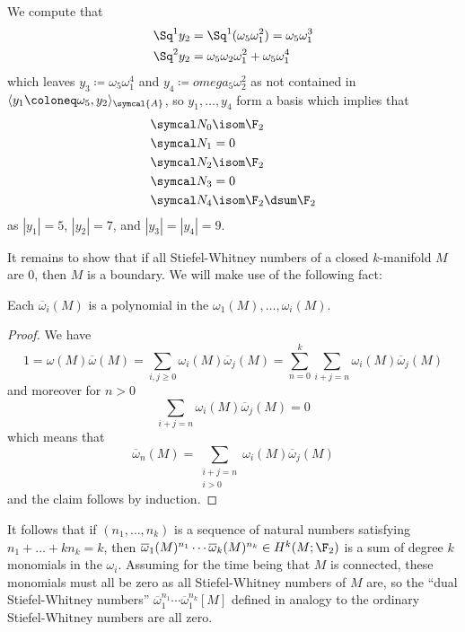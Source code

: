 \begin{example}
	We compute that
	\begin{align*}
		\Sq^1 y_2 &= \Sq^1 (\omega_5 \omega_1^2) = \omega_5 \omega_1^3 \\
		\Sq^2 y_2 &= \omega_5 \omega_2 \omega_1^2 + \omega_5 \omega_1^4
	\end{align*}
	which leaves $y_3 \coloneq \omega_5 \omega_1^4$ and $y_4 \coloneq omega_5 \omega_2^2$ as not contained in $\langle y_1 \coloneq \omega_5, y_2 \rangle_{\symcal{A}}$, so $y_1, \ldots, y_4$ form a basis which implies that
	\begin{align*}
		\Bord_0 &\isom \F_2 \\
		\Bord_1 &= 0 \\
		\Bord_2 &\isom \F_2 \\
		\Bord_3 &= 0 \\
		\Bord_4 &\isom \F_2 \dsum \F_2
	\end{align*}
	as $|y_1| = 5$, $|y_2| = 7$, and $|y_3| = |y_4| = 9$.
\end{example}
It remains to show that if all Stiefel-Whitney numbers of a closed $k$-manifold $M$ are 0, then $M$ is a boundary.
We will make use of the following fact:
\begin{lemma}
	Each $\overline{\omega}_i(M)$ is a polynomial in the $\omega_1(M), \ldots, \omega_i(M)$.
\end{lemma}
\begin{proof}
	We have 
	\begin{equation*}
		1 = \omega(M) \overline{\omega}(M) = \sum_{i, j \geq 0} \omega_i(M) \overline{\omega}_j(M) = \sum_{n = 0}^k \sum_{i + j = n} \omega_i(M) \overline{\omega}_j(M)
	\end{equation*}
	and moreover for $n > 0$
	\begin{equation*}
		\sum_{i + j = n} \omega_i(M) \overline{\omega}_j(M) = 0
	\end{equation*}
	which means that
	\begin{equation*}
		\overline{\omega}_n(M) = \sum_{\substack{i + j = n \\ i > 0}} \omega_i(M) \overline{\omega}_j(M)
	\end{equation*}
	and the claim follows by induction.
\end{proof}
It follows that if $(n_1, \ldots, n_k)$ is a sequence of natural numbers satisfying $n_1 + \ldots + k n_k = k$, then $\overline{\omega}_1(M)^{n_1} \cdots \overline{\omega}_k(M)^{n_k} \in H^k(M; \F_2)$ is a sum of degree $k$ monomials in the $\omega_i$.
Assuming for the time being that $M$ is connected, these monomials must all be zero as all Stiefel-Whitney numbers of $M$ are, so the \enquote{dual Stiefel-Whitney numbers} $\overline{\omega}_1^{n_1} \cdots \overline{\omega}_1^{n_k}[M]$ defined in analogy to the ordinary Stiefel-Whitney numbers are all zero.

